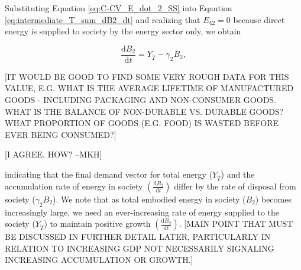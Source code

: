 \documentclass[authoryear,preprint,review,12pt]{elsarticle}
\begin{document}
Substituting Equation \ref{eq:C-CV_E_dot_2_SS} into Eqaution \ref{eq:intermediate_T_sum_dB2_dt} and realizing that $\dot{E}_{42} = 0$ because direct energy is supplied to society by the energy sector only, we obtain 

\begin{equation} \label{eq:compare_demand_and_accumulation}
	\frac{\mathrm{d}B_{2}}{\mathrm{d}t} = Y_{\dot{T}} - \gamma_{2}B_{2},
\end{equation}

[IT WOULD BE GOOD TO FIND SOME VERY ROUGH DATA FOR THIS VALUE, E.G. WHAT IS THE AVERAGE LIFETIME OF MANUFACTURED GOODS - INCLUDING PACKAGING AND NON-CONSUMER GOODS. WHAT IS THE BALANCE OF NON-DURABLE VS. DURABLE GOODS? WHAT PROPORTION OF GOODS (E.G. FOOD) IS WASTED BEFORE EVER BEING CONSUMED?]

[I AGREE. HOW? --MKH]

\noindent indicating that the final demand vector for total energy ($Y_{\dot{T}}$) and the accumulation rate of energy in society $\left(\frac{\mathrm{d}B_{2}}{\mathrm{d}t}\right)$ differ by the rate of disposal from society ($\gamma_{2}B_{2}$). We note that as total embodied energy in society ($B_{2}$) becomes increasingly large, we need an ever-increasing rate of energy supplied to the society ($Y_{\dot{T}}$) to maintain positive growth $\left(\frac{\mathrm{d}B_{2}}{\mathrm{d}t}\right)$. [MAIN POINT THAT MUST BE DISCUSSED IN FURTHER DETAIL LATER, PARTICULARLY IN RELATION TO INCREASING GDP NOT NECESSARILY SIGNALING INCREASING ACCUMULATION OR GROWTH.]

%
%
%
%
%
%
%
\end{document}
